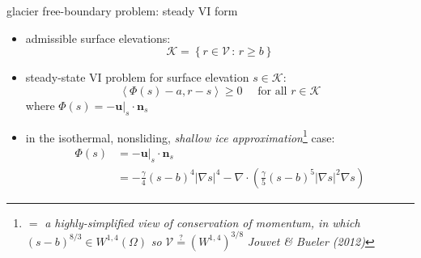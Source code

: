 \documentclass[svgnames,
               hyperref={colorlinks,citecolor=DeepPink4,linkcolor=FireBrick,urlcolor=Maroon},
               usepdftitle=false]  %
               {beamer}
\newcommand{\grad}{\nabla}
\newcommand{\bn}{\mathbf{n}}
\newcommand{\bu}{\mathbf{u}}
\newcommand{\ip}[2]{\left<#1,#2\right>}
\begin{document}
\begin{frame}{glacier free-boundary problem: steady VI form}

\begin{itemize}
\item admissible surface elevations:
    $$\mathcal{K} = \left\{r \in \mathcal{V} \,:\, r \ge b\right\}$$
\item steady-state VI problem for surface elevation $s\in\mathcal{K}$:
       $$\ip{\Phi(s) - a}{r-s} \ge 0 \quad \text{ for all } r \in \mathcal{K}$$
where $\Phi(s)=- \bu|_s \cdot \bn_s$
\item in the isothermal, nonsliding, \emph{shallow ice approximation}\footnote{$=$ \emph{a highly-simplified view of conservation of momentum, in which} $(s-b)^{8/3} \in W^{1,4}(\Omega)$ \emph{so} $\mathcal{V} \stackrel{?}{=} (W^{1,4})^{3/8}$ \hfill \emph{Jouvet \& Bueler (2012)}} case:
\begin{align*}
\Phi(s) &= - \bu|_s \cdot \bn_s \\
        &= - \frac{\gamma}{4} (s-b)^{4} |\grad s|^{4} - \grad \cdot\left(\frac{\gamma}{5} (s-b)^{5} |\grad s|^{2} \grad s\right)
\end{align*}
\end{itemize}
\end{frame}
\end{document}
